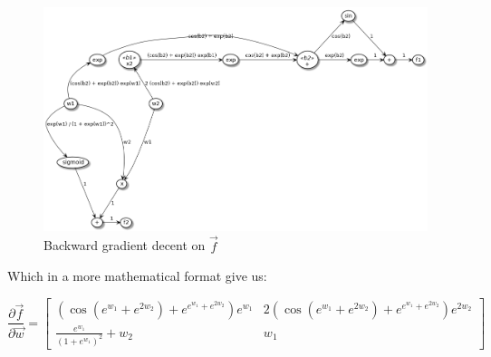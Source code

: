 

\begin{figure}
    \begin{center}
        \includegraphics[width=\textwidth]{../2_automatocDifferentiation/computation_graph_backward.png}
        \caption{Backward gradient decent on $\vec{f}$}
    \end{center}
\end{figure}

Which in a more mathematical format give us:

\[
    \frac{\partial \vec{f}}{\partial \vec{w}} =
    \begin{bmatrix}
        ( \cos(e^{w_1} + e^{2 w_2}) + e^{e^{w_1} + e^{2 w_2}} ) e^{w_1}   &   2 ( \cos(e^{w_1} + e^{2 w_2}) + e^{e^{w_1} + e^{2 w_2}} ) e^{2 w_2} \\
        \frac{e^{w_1}}{(1 + e^{w_1})^2} + w_2                             &   w_1
    \end{bmatrix}
\]

